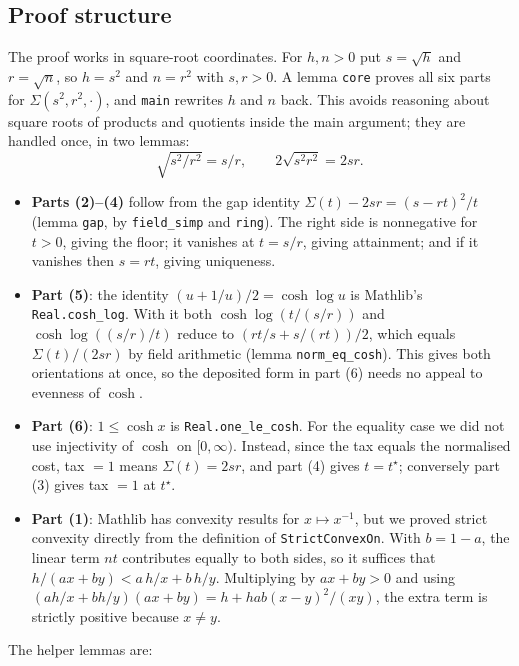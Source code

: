 \documentclass[11pt]{article}
\theoremstyle{definition}
\theoremstyle{remark}
\begin{document}
\subsection{Proof structure}
The proof works in square-root coordinates. For $h,n>0$ put $s=\sqrt h$ and $r=\sqrt n$, so $h=s^2$ and $n=r^2$ with $s,r>0$.
A lemma \texttt{core} proves all six parts for $\Sigma(s^2,r^2,\cdot)$, and \texttt{main} rewrites $h$ and $n$ back.
This avoids reasoning about square roots of products and quotients inside the main argument; they are handled once, in two lemmas:
\[
\sqrt{s^2/r^2}=s/r,\qquad 2\sqrt{s^2r^2}=2sr .
\]
\begin{itemize}
\item \textbf{Parts (2)--(4)} follow from the gap identity $\Sigma(t)-2sr=(s-rt)^2/t$ (lemma \texttt{gap}, by \texttt{field\_simp} and \texttt{ring}).
The right side is nonnegative for $t>0$, giving the floor; it vanishes at $t=s/r$, giving attainment; and if it vanishes then
$s=rt$, giving uniqueness.
\item \textbf{Part (5)}: the identity $(u+1/u)/2=\cosh\log u$ is Mathlib's \texttt{Real.cosh\_log}. With it both
$\cosh\log(t/(s/r))$ and $\cosh\log((s/r)/t)$ reduce to $(rt/s+s/(rt))/2$, which equals $\Sigma(t)/(2sr)$ by field arithmetic
(lemma \texttt{norm\_eq\_cosh}). This gives both orientations at once, so the deposited form in part (6) needs no appeal to evenness of $\cosh$.
\item \textbf{Part (6)}: $1\le\cosh x$ is \texttt{Real.one\_le\_cosh}. For the equality case we did not use injectivity of $\cosh$ on $[0,\infty)$.
Instead, since the tax equals the normalised cost, tax $=1$ means $\Sigma(t)=2sr$, and part (4) gives $t=t^\star$; conversely part (3) gives tax $=1$ at $t^\star$.
\item \textbf{Part (1)}: Mathlib has convexity results for $x\mapsto x^{-1}$, but we proved strict convexity directly from the definition
of \texttt{StrictConvexOn}. With $b=1-a$, the linear term $nt$ contributes equally to both sides, so it suffices that
$h/(ax+by)<a\,h/x+b\,h/y$. Multiplying by $ax+by>0$ and using
$(ah/x+bh/y)(ax+by)=h+hab(x-y)^2/(xy)$, the extra term is strictly positive because $x\ne y$.
\end{itemize}
The helper lemmas are:
\end{document}

